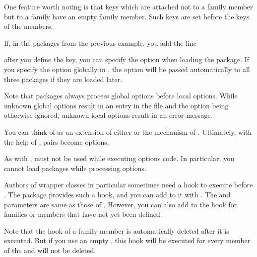 One feature worth noting is that keys which are attached not to a family
member but to a family have an empty family member. Such keys are set before
the keys of the members.
\begin{Example}
  If, in the packages from the previous example, you add the line
\begin{lstcode}
\end{lstcode}
  after you define the key, you can specify the  option when
  loading the package. If you specify the option globally in
  , the option will be passed automatically to all three
  packages if they are loaded later.
\end{Example}
Note that packages always process global options
before local options. While unknown global options result in an entry in the
 file and the option being otherwise ignored, unknown local
options result in an error message.

You can think of  as an extension of either
 or the  mechanism
of . Ultimately, with the help of
,  pairs become options.%

As with ,
 must not be used while executing options code.
In particular, you cannot load packages while processing options.%
%
\EndIndexGroup


\begin{Declaration}
\end{Declaration}
Authors of wrapper classes in particular
sometimes need a hook to execute  before
. The  package
provides such a hook, and you can add  to it with
. The  and 
parameters are same as those of .
However, you can also add  to the hook for families or members
that have not yet been defined.

Note that the hook of a family member is automatically deleted after it is
executed. But if you use an empty , this hook will
be executed for every member of the  and will not be deleted.

